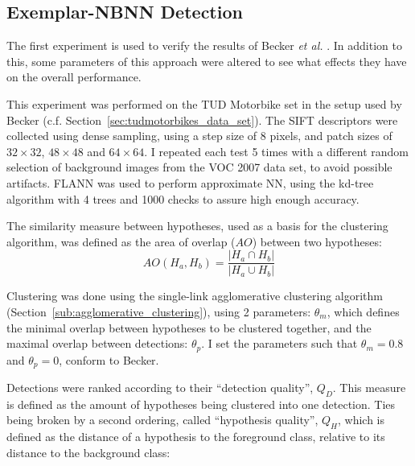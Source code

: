 % 

\subsection{Exemplar-NBNN Detection} %
\label{sec:nbnn_detection}

The first experiment is used to verify the results of Becker \emph{et al.} \cite{becker2012codebook}. In addition to this, some parameters of this approach were altered to see what effects they have on the overall performance.

This experiment was performed on the TUD Motorbike set in the setup used by Becker (c.f. Section~\ref{sec:tudmotorbikes_data_set}). The SIFT descriptors were collected using dense sampling, using a step size of 8 pixels, and patch sizes of $32\times32$, $48\times48$ and $64\times64$. I repeated each test 5 times with a different random selection of background images from the VOC 2007 data set, to avoid possible artifacts. FLANN was used to perform approximate NN, using the kd-tree algorithm with 4 trees and 1000 checks to assure high enough accuracy.

The similarity measure between hypotheses, used as a basis for the clustering algorithm, was defined as the area of overlap ($AO$) between two hypotheses:
\begin{equation}
    AO(H_a, H_b)= \frac{|H_a\cap H_b|}{|H_a\cup H_b|}
\end{equation}

Clustering was done using the single-link agglomerative clustering algorithm (Section~\ref{sub:agglomerative_clustering}), using 2 parameters: $\theta_m$, which defines the minimal overlap between hypotheses to be clustered together, and the maximal overlap between detections: $\theta_p$. I set the parameters such that $\theta_m = 0.8$ and $\theta_p = 0$, conform to Becker.

Detections were ranked according to their ``detection quality'', $Q_D$. This measure is defined as the amount of hypotheses being clustered into one detection. Ties being broken by a second ordering, called ``hypothesis quality'', $Q_H$, which is defined as the distance of a hypothesis to the foreground class, relative to its distance to the background class: 

